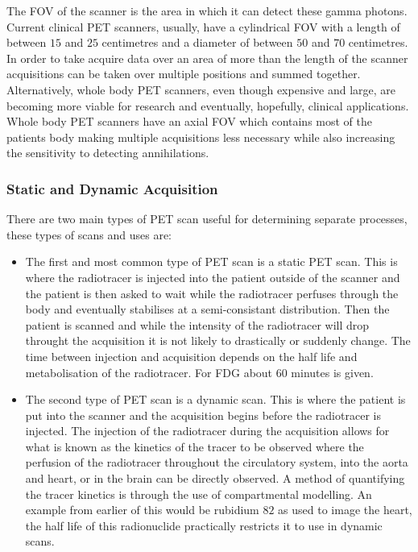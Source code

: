             The \gls{FOV} of the scanner is the area in which it can detect these gamma photons. Current clinical \gls{PET} scanners, usually, have a cylindrical \gls{FOV} with a length of between $15$ and $25$ centimetres and a diameter of between $50$ and $70$ centimetres. In order to take acquire data over an area of more than the length of the scanner acquisitions can be taken over multiple positions and summed together. Alternatively, whole body \gls{PET} scanners, even though expensive and large, are becoming more viable for research and eventually, hopefully, clinical applications. Whole body \gls{PET} scanners have an axial \gls{FOV} which contains most of the patients body making multiple acquisitions less necessary while also increasing the sensitivity to detecting annihilations.
            
            \subsubsection{Static and Dynamic Acquisition} \label{static_and_dynamic_acquisition}
                There are two main types of \gls{PET} scan useful for determining separate processes, these types of scans and uses are:
                
                \begin{itemize}
                    \item The first and most common type of \gls{PET} scan is a static \gls{PET} scan. This is where the radiotracer is injected into the patient outside of the scanner and the patient is then asked to wait while the radiotracer perfuses through the body and eventually stabilises at a semi-consistant distribution. Then the patient is scanned and while the intensity of the radiotracer will drop throught the acquisition it is not likely to drastically or suddenly change. The time between injection and acquisition depends on the half life and metabolisation of the radiotracer. For \gls{FDG} about $60$ minutes is given.
                    
                    \item The second type of \gls{PET} scan is a dynamic scan. This is where the patient is put into the scanner and the acquisition begins before the radiotracer is injected. The injection of the radiotracer during the acquisition allows for what is known as the kinetics of the tracer to be observed where the perfusion of the radiotracer throughout the circulatory system, into the aorta and heart, or in the brain can be directly observed. A method of quantifying the tracer kinetics is through the use of compartmental modelling. An example from earlier of this would be rubidium $82$ as used to image the heart, the half life of this radionuclide practically restricts it to use in dynamic scans.
                \end{itemize}
            
